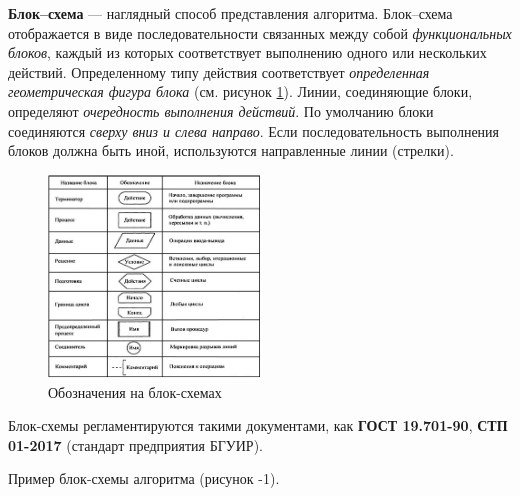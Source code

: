 \textbf{Блок--схема} --- наглядный способ представления алгоритма.
Блок--схема отображается в виде последовательности связанных между собой
\emph{функциональных блоков}, каждый из которых соответствует выполнению
одного или нескольких действий. Определенному типу действия
соответствует \emph{определенная геометрическая фигура блока} (см. рисунок \ref{fig:schematic}). Линии,
соединяющие блоки, определяют \emph{очередность выполнения действий}. По
умолчанию блоки соединяются \emph{сверху вниз и слева направо}. Если
последовательность выполнения блоков должна быть иной, используются
направленные линии (стрелки).

\begin{figure}[h]
\centering
\includegraphics[width=0.5\textwidth]{./res/schematics.png}
\caption{Обозначения на блок-схемах}
\label{fig:schematic}
\end{figure}

Блок-схемы регламентируются такими документами, как \textbf{ГОСТ
19.701-90}, \textbf{СТП 01-2017} (стандарт предприятия БГУИР).

Пример блок-схемы алгоритма (рисунок -1).
